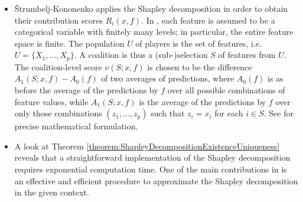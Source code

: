 \begin{itemize}
\begin{itemize}
	\item
		\v{S}trumbelj-Kononenko \cite{Strumbelj2010} applies
		the Shapley decomposition %
		in order to obtain their contribution scores $R_{i}(x,f)$.
		In \cite{Strumbelj2010},
		each feature is assumed to be a categorical variable with finitely many levels;
		in particular, the entire feature space is finite.
		The population $U$ of players is the set of features, i.e. $U = \{X_{1},\ldots,X_{p}\}$.
		A coalition is thus a (sub-)selection $S$ of features from $U$.
		The coalition-level score $\nu(S;x,f)$ is chosen to be the difference
		$A_{1}(S;x,f) - A_{0}(f)$
		of two averages of predictions, where $A_{0}(f)$ is as before
		the average of the predictions by $f$ over all possible combinations of feature values,
		while $A_{1}(S;x,f)$ is the average of the predictions by $f$ over only those combinations
		$(z_{1},\ldots,z_{p})$ such that $z_{i} = x_{i}$ for each $i \in S$.
		See \cite{Strumbelj2010} for precise mathematical formulation.

	\item
		A look at
		Theorem \ref{theorem:ShapleyDecompositionExistenceUniqueness}
		reveals that a straightforward implementation of the Shapley decomposition
		requires exponential computation time.
		One of the main contributions in \cite{Strumbelj2010} is
		an effective and efficient procedure to approximate
		the Shapley decomposition in the given context.


\end{itemize}
\end{itemize}
